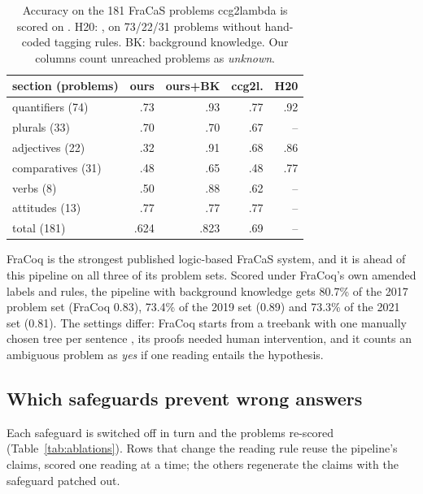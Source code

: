 \documentclass[11pt]{article}
\newcommand{\yes}{\textit{yes}}
\newcommand{\unk}{\textit{unknown}}
\begin{document}
\begin{table}[t]
\centering\small
\setlength{\tabcolsep}{3.5pt}
\begin{tabular}{lrrrr}
\toprule
section (problems) & ours & ours+BK & ccg2l. & H20 \\
\midrule
quantifiers (74) & .73 & .93 & .77 & .92 \\
plurals (33) & .70 & .70 & .67 & -- \\
adjectives (22) & .32 & .91 & .68 & .86 \\
comparatives (31) & .48 & .65 & .48 & .77 \\
verbs (8) & .50 & .88 & .62 & -- \\
attitudes (13) & .77 & .77 & .77 & -- \\
\midrule
total (181) & .624 & .823 & .69 & -- \\
\bottomrule
\end{tabular}
\caption{Accuracy on the 181 FraCaS problems ccg2lambda is scored on
\citep[Table 3]{mineshima-etal-2015-higher}. H20:
\citet{haruta-etal-2020-logical}, on 73/22/31 problems without
hand-coded tagging rules. BK: background knowledge. Our columns count
unreached problems as \unk{}.}
\label{tab:ccg}
\end{table}

FraCoq \citep{bernardy-chatzikyriakidis-2017-type,bernardy-chatzikyriakidis-2019-wide,bernardy-chatzikyriakidis-2021-applied}
is the strongest published logic-based FraCaS system, and it is ahead
of this pipeline on all three of its problem sets. Scored under FraCoq's own amended labels
and rules, the pipeline with background knowledge gets 80.7\% of the
2017 problem set (FraCoq 0.83), 73.4\% of the 2019 set (0.89) and 73.3\%
of the 2021 set (0.81). The settings differ: FraCoq starts from a
treebank with one manually chosen tree per sentence
\citep{ljunglof-siverbo-2011-bilingual}, its proofs needed human
intervention, and it counts an ambiguous problem as \yes{} if one reading
entails the hypothesis.

\subsection{Which safeguards prevent wrong answers}
\label{sec:ablations}

Each safeguard is switched off in turn and the problems re-scored
(Table~\ref{tab:ablations}). Rows that change the reading rule reuse the
pipeline's claims, scored one reading at a time; the others regenerate
the claims with the safeguard patched out.
\end{document}
